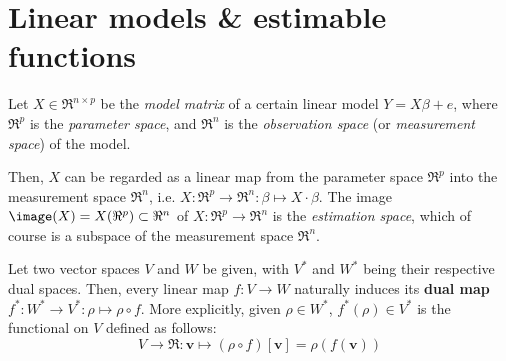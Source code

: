 \documentclass{article}
\begin{document}


\pagestyle{fancy}

%

\lfoot[]{}
\cfoot[]{}
\rfoot[]{\thepage}


\large


\section{Linear models \& estimable functions}
\setcounter{theorem}{0}

Let $X \in \Re^{n \times p}$ be the \emph{model matrix} of a certain linear model $Y = X\beta + e$, where $\Re^{p}$ is the \emph{parameter space}, and $\Re^{n}$ is the \emph{observation space} (or \emph{measurement space}) of the model.

Then, $X$ can be regarded as a linear map from the parameter space $\Re^{p}$ into the measurement space $\Re^{n}$, i.e. $X : \Re^{p} \longrightarrow \Re^{n} : \beta \longmapsto X\cdot \beta$.  The image $\image(X) = X\!\left(\Re^{p}\right) \subset \Re^{n}$ of $X : \Re^{p} \longrightarrow \Re^{n}$ is the \emph{estimation space}, which of course is a subspace of the measurement space $\Re^{n}$.

\begin{remark}\quad
Let two vector spaces $V$ and $W$ be given, with $V^{*}$ and $W^{*}$ being their respective dual spaces.  Then, every linear map $f : V \longrightarrow W$ naturally induces its \textbf{dual map} $f^{*} : W^{*} \longrightarrow V^{*} : \rho \longmapsto \rho \circ f$.  More explicitly, given $\rho \in W^{*}$, $f^{*}(\rho) \in V^{*}$ is the functional on $V$ defined as follows:
\begin{equation*}
V \longrightarrow \Re : \mathbf{v} \longmapsto (\rho \circ f)\left[\mathbf{v}\right] = \rho(f(\mathbf{v}))
\end{equation*}
\end{remark}
\end{document}
